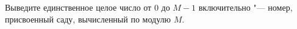 Выведите единственное целое число от $0$ до $M - 1$ включительно "--- номер,
присвоенный саду, вычисленный по модулю $M$.
